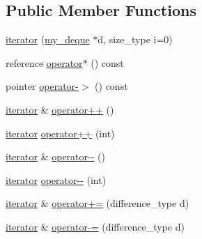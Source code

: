 \subsection*{Public Member Functions}
\begin{DoxyCompactItemize}
\item 
\hyperlink{classmy__deque_1_1iterator_aec0fe04592f368d22e4d80128dc909cb}{iterator} (\hyperlink{classmy__deque}{my\-\_\-deque} $\ast$d, size\-\_\-type i=0)
\item 
reference \hyperlink{classmy__deque_1_1iterator_a12632f02814bba64ca79f42edc0e1497}{operator$\ast$} () const 
\item 
pointer \hyperlink{classmy__deque_1_1iterator_a064f5b1faf5a72113083425133de9a41}{operator-\/$>$} () const 
\item 
\hyperlink{classmy__deque_1_1iterator}{iterator} \& \hyperlink{classmy__deque_1_1iterator_ab2a00619614e204eedb184112a56016e}{operator++} ()
\item 
\hyperlink{classmy__deque_1_1iterator}{iterator} \hyperlink{classmy__deque_1_1iterator_a57f6ac4aef7215ca67b6e05eeda29ee4}{operator++} (int)
\item 
\hyperlink{classmy__deque_1_1iterator}{iterator} \& \hyperlink{classmy__deque_1_1iterator_a278cab96c03498e55ba1aa4e05f1538e}{operator-\/-\/} ()
\item 
\hyperlink{classmy__deque_1_1iterator}{iterator} \hyperlink{classmy__deque_1_1iterator_a5bef4b6332aecf7dcda57cee9a1fdc70}{operator-\/-\/} (int)
\item 
\hyperlink{classmy__deque_1_1iterator}{iterator} \& \hyperlink{classmy__deque_1_1iterator_ad17b4f6e8be4d8242ad4572d62beff82}{operator+=} (difference\-\_\-type d)
\item 
\hyperlink{classmy__deque_1_1iterator}{iterator} \& \hyperlink{classmy__deque_1_1iterator_a13c056d48543734a23a9de09fd652868}{operator-\/=} (difference\-\_\-type d)
\end{DoxyCompactItemize}
